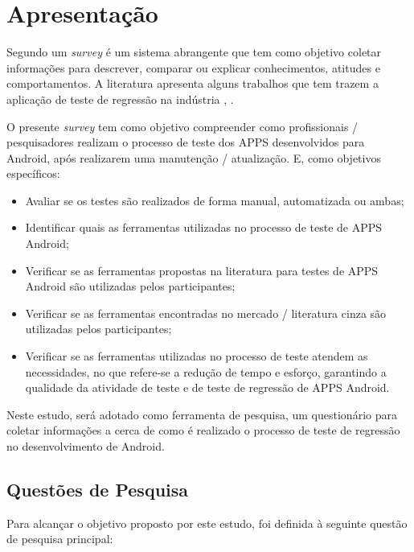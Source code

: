 \acresetall 

\section{Apresentação}

Segundo \cite{PSK2001} um \textit{survey} é um sistema abrangente que tem como objetivo coletar informações para descrever, comparar ou explicar conhecimentos, atitudes e comportamentos. A literatura apresenta alguns trabalhos que tem trazem a aplicação de teste de regressão na indústria \cite{Ali2019}, \cite{630875}.


O presente \textit{survey} tem como objetivo compreender como profissionais / pesquisadores realizam o processo de teste dos \ac{APPS} desenvolvidos para Android, após realizarem uma manutenção / atualização. E, como objetivos específicos:

\begin{itemize}
    \item Avaliar se os testes são realizados de forma manual, automatizada ou ambas;
    \item Identificar quais as ferramentas utilizadas no processo de teste de \ac{APPS} Android;
    \item Verificar se as ferramentas propostas na literatura para testes de \ac{APPS} Android são utilizadas pelos participantes;
    \item Verificar se as ferramentas encontradas no mercado / literatura cinza são utilizadas pelos participantes;
    \item Verificar se as ferramentas utilizadas no processo de teste atendem as necessidades, no que refere-se a redução de tempo e esforço, garantindo a qualidade da atividade de teste e de teste de regressão de \ac{APPS} Android.
\end{itemize}

Neste estudo, será adotado como ferramenta de pesquisa, um questionário para coletar informações a cerca de como é realizado o processo de teste de regressão no desenvolvimento de  Android.

\subsection{Questões de Pesquisa}
Para alcançar o objetivo proposto por este estudo, foi definida à seguinte questão de pesquisa principal:
\leavevspace 

\begin{center}
    \noindent{}
\end{center}

